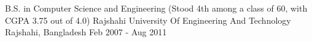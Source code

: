 

\begin{cventries}

  \cventry
    {B.S. in Computer Science and Engineering (Stood 4th among a class of 60, with CGPA 3.75 out of 4.0)} %
    {Rajshahi University Of Engineering And Technology} %
    {Rajshahi, Bangladesh} %
    {Feb 2007 - Aug 2011} %
    {
    }

\end{cventries}
